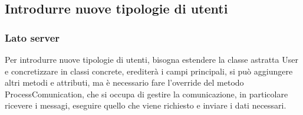 \subsection{Introdurre nuove tipologie di utenti}
\subsubsection{Lato server}
Per introdurre nuove tipologie di utenti, bisogna estendere la classe astratta User e concretizzare in classi concrete, erediterà i campi principali, si può aggiungere altri metodi e attributi, ma è necessario fare l'override del metodo ProcessComunication, che si occupa di gestire la comunicazione, in particolare ricevere i messagi, eseguire quello che viene richiesto e inviare i dati necessari.
